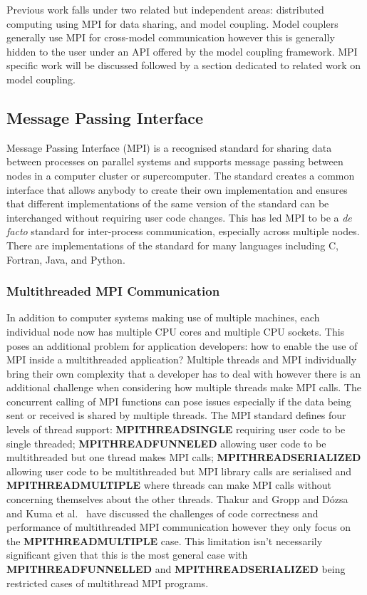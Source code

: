 \documentclass{acm_proc_article-sp}
\renewcommand{\_}{\underscore\hspace{0pt}}
\begin{document}
Previous work falls under two related but independent areas: distributed
computing using MPI for data sharing, and model coupling. Model couplers
generally use MPI for cross-model communication however this is generally hidden
to the user under an API offered by the model coupling framework. MPI specific
work will be discussed followed by a section dedicated to related work on model
coupling.

\subsection*{Message Passing Interface}

Message Passing Interface (MPI) is a recognised standard for sharing data
between processes on parallel systems and supports message passing between nodes
in a computer cluster or supercomputer. The standard creates a common interface
that allows anybody to create their own implementation and ensures that
different implementations of the same version of the standard can be
interchanged without requiring user code changes. This has led MPI to be a
\textit{de facto} standard for inter-process communication, especially across
multiple nodes. There are implementations of the standard for many languages
including C, Fortran, Java, and Python.

\subsubsection*{Multithreaded MPI Communication}

In addition to computer systems making use of multiple machines, each individual
node now has multiple CPU cores and multiple CPU sockets. This poses an
additional problem for application developers: how to enable the use of MPI
inside a multithreaded application? Multiple threads and MPI individually bring
their own complexity that a developer has to deal with however there is an
additional challenge when considering how multiple threads make MPI calls. The
concurrent calling of MPI functions can pose issues especially if the data being
sent or received is shared by multiple threads. The MPI standard defines four
levels of thread support: \textbf{MPI\_THREAD\_SINGLE} requiring user code to be
single threaded; \textbf{MPI\_THREAD\_FUNNELED} allowing user code to be
multithreaded but one thread makes MPI calls; \textbf{MPI\_THREAD\_SERIALIZED}
allowing user code to be multithreaded but MPI library calls are serialised and
\textbf{MPI\_THREAD\_MULTIPLE} where threads can make MPI calls without
concerning themselves about the other threads. Thakur and Gropp
\cite{Thakur2009} and D\'{o}zsa and Kuma et al.\ \cite{Kumar} have discussed the
challenges of code correctness and performance of multithreaded MPI
communication however they only focus on the \textbf{MPI\_THREAD\_MULTIPLE}
case. This limitation isn't necessarily significant given that this is the most
general case with \textbf{MPI\_THREAD\_FUNNELLED} and
\textbf{MPI\_THREAD\_SERIALIZED} being restricted cases of multithread MPI
programs.
\end{document}
